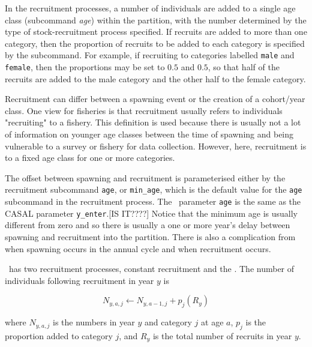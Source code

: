 In the recruitment processes, a number of individuals are added to a single age class (subcommand \textit{age}) within the partition, with the number determined by the type of stock-recruitment process specified. If recruits are added to more than one category, then the proportion of recruits to be added to each category is specified by the  subcommand. For example, if recruiting to categories labelled \texttt{male} and \texttt{female}, then the proportions may be set to $0.5$ and $0.5$, so that half of the recruits are added to the male category and the other half to the female category.



Recruitment can differ between a spawning event or the creation of a cohort/year class. One view for fisheries is that recruitment usually refers to individuals "recruiting" to a fishery. This definition is used because there is usually not a lot of information on younger age classes between the time of spawning and being vulnerable to a survey or fishery for data collection. However, here, recruitment is to a fixed age class for one or more categories. 

The offset between spawning and recruitment is parameterised either by the recruitment subcommand \texttt{age}, or \texttt{min\_age}, which is the default value for the \texttt{age} subcommand in the recruitment process. The \CNAME~parameter \texttt{age} is the same as the CASAL parameter \texttt{y\_enter}.[IS IT????] Notice that the minimum age is usually different from zero and so there is usually  a one or more year's delay between spawning and recruitment into the partition. There is also a complication from when spawning occurs in the annual cycle and when recruitment occurs.


\CNAME~has two  recruitment processes, constant recruitment and the  \citep{1203}. The  number of individuals following recruitment in year $y$ is

\begin{equation}
N_{y,a,j} \leftarrow N_{y,a - 1,j} + p_j(R_y)
\end{equation}

where $N_{y,a,j}$ is the numbers in year $y$ and category $j$ at age $a$, $p_j$ is the proportion added to category $j$, and $R_y$ is the total number of recruits in year $y$.

\paragraph{}\label{subsubsec:constant-recruitment}

